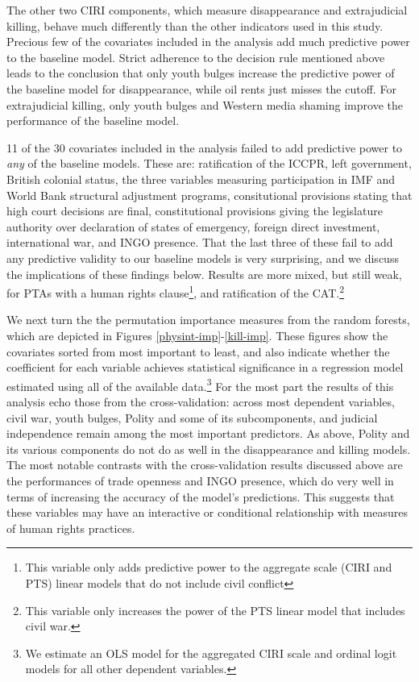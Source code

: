 \documentclass[12pt]{article}
\begin{document}
The other two CIRI components, which measure disappearance and extrajudicial killing, behave much differently than the other indicators used in this study. Precious few of the covariates included in the analysis add much predictive power to the baseline model. Strict adherence to the decision rule mentioned above leads to the conclusion that only youth bulges increase the predictive power of the baseline model for disappearance, while oil rents just misses the cutoff. For extrajudicial killing, only youth bulges and Western media shaming improve the performance of the baseline model. 

11 of the 30 covariates included in the analysis failed to add predictive power to {\it any} of the baseline models. These are: ratification of the ICCPR, left government, British colonial status, the three variables measuring participation in IMF and World Bank structural adjustment programs, consitutional provisions stating that high court decisions are final, constitutional provisions giving the legislature authority over declaration of states of emergency, foreign direct investment, international war, and INGO presence. That the last three of these fail to add any predictive validity to our baseline models is very surprising, and we discuss the implications of these findings below. Results are more mixed, but still weak, for PTAs with a human rights clause\footnote{This variable only adds predictive power to the aggregate scale (CIRI and PTS) linear models that do not include civil conflict}, and ratification of the CAT.\footnote{This variable only increases the power of the PTS linear model that includes civil war.}

We next turn the the permutation importance measures from the random forests, which are depicted in Figures \ref{physint-imp}-\ref{kill-imp}. These figures show the covariates sorted from most important to least, and also indicate whether the coefficient for each variable achieves statistical significance in a regression model estimated using all of the available data.\footnote{We estimate an OLS model for the aggregated CIRI scale and ordinal logit models for all other dependent variables.} For the most part the results of this analysis echo those from the cross-validation: across most dependent variables, civil war, youth bulges, Polity and some of its subcomponents, and judicial independence remain among the most important predictors. As above, Polity and its various components do not do as well in the disappearance and killing models. The most notable contrasts with the cross-validation results discussed above are the performances of trade openness and INGO presence, which do very well in terms of increasing the accuracy of the model's predictions. This suggests that these variables may have an interactive or conditional relationship with measures of human rights practices. 
\end{document}
